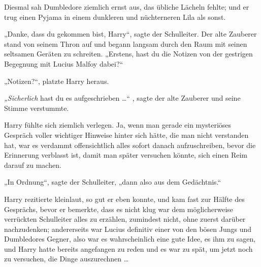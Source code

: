 Diesmal sah Dumbledore ziemlich ernst aus, das übliche Lächeln fehlte; und er trug einen Pyjama in einem dunkleren und nüchterneren Lila als sonst.

„Danke, dass du gekommen bist, Harry“, sagte der Schulleiter. Der alte Zauberer stand von seinem Thron auf und begann langsam durch den Raum mit seinen seltsamen Geräten zu schreiten.
„Erstens, hast du die Notizen von der gestrigen Begegnung mit Lucius Malfoy dabei?“

„Notizen?“, platzte Harry heraus.

\emph{„Sicherlich} hast du es aufgeschrieben …“ , sagte der alte Zauberer und seine Stimme verstummte.

Harry fühlte sich ziemlich verlegen. Ja, wenn man gerade ein mysteriöses Gespräch voller wichtiger Hinweise hinter sich hätte, die man nicht verstanden hat, war es verdammt offensichtlich alles sofort danach aufzuschreiben, bevor die Erinnerung verblasst ist, damit man später versuchen könnte, sich einen Reim darauf zu machen.

„In Ordnung“, sagte der Schulleiter, „dann also aus dem Gedächtnis.“

Harry rezitierte kleinlaut, so gut er eben konnte, und kam fast zur Hälfte des Gesprächs, bevor er bemerkte, dass es nicht klug war dem möglicherweise verrückten Schulleiter alles zu erzählen, zumindest nicht, ohne zuerst darüber nachzudenken; andererseits war Lucius definitiv einer von den bösen Jungs und Dumbledores Gegner, also war es wahrscheinlich eine gute Idee, es ihm zu sagen, und Harry hatte bereits angefangen zu reden und es war zu spät, um jetzt noch zu versuchen, die Dinge auszurechnen …

